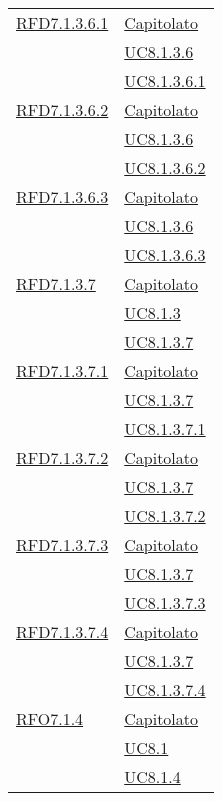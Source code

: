 \begin{longtable}{|>{\centering}m{5cm}|m{5cm}<{\centering}|}
\hyperlink{RFD7.1.3.6.1}{RFD7.1.3.6.1} & \hyperlink{Capitolato}{Capitolato}\\
& \hyperref[UC8.1.3.6]{UC8.1.3.6}\\
& \hyperref[UC8.1.3.6.1]{UC8.1.3.6.1}\\ \hline

\hyperlink{RFD7.1.3.6.2}{RFD7.1.3.6.2} & \hyperlink{Capitolato}{Capitolato}\\
& \hyperref[UC8.1.3.6]{UC8.1.3.6}\\
& \hyperref[UC8.1.3.6.2]{UC8.1.3.6.2}\\ \hline

\hyperlink{RFD7.1.3.6.3}{RFD7.1.3.6.3} & \hyperlink{Capitolato}{Capitolato}\\
& \hyperref[UC8.1.3.6]{UC8.1.3.6}\\
& \hyperref[UC8.1.3.6.3]{UC8.1.3.6.3}\\ \hline

\hyperlink{RFD7.1.3.7}{RFD7.1.3.7} & \hyperlink{Capitolato}{Capitolato}\\
& \hyperref[UC8.1.3]{UC8.1.3}\\
& \hyperref[UC8.1.3.7]{UC8.1.3.7}\\ \hline

\hyperlink{RFD7.1.3.7.1}{RFD7.1.3.7.1} & \hyperlink{Capitolato}{Capitolato}\\
& \hyperref[UC8.1.3.7]{UC8.1.3.7}\\
& \hyperref[UC8.1.3.7.1]{UC8.1.3.7.1}\\ \hline

\hyperlink{RFD7.1.3.7.2}{RFD7.1.3.7.2} & \hyperlink{Capitolato}{Capitolato}\\
& \hyperref[UC8.1.3.7]{UC8.1.3.7}\\
& \hyperref[UC8.1.3.7.2]{UC8.1.3.7.2}\\ \hline

\hyperlink{RFD7.1.3.7.3}{RFD7.1.3.7.3} & \hyperlink{Capitolato}{Capitolato}\\
& \hyperref[UC8.1.3.7]{UC8.1.3.7}\\
& \hyperref[UC8.1.3.7.3]{UC8.1.3.7.3}\\ \hline

\hyperlink{RFD7.1.3.7.4}{RFD7.1.3.7.4} & \hyperlink{Capitolato}{Capitolato}\\
& \hyperref[UC8.1.3.7]{UC8.1.3.7}\\
& \hyperref[UC8.1.3.7.4]{UC8.1.3.7.4}\\ \hline

\hyperlink{RFO7.1.4}{RFO7.1.4} & \hyperlink{Capitolato}{Capitolato}\\
& \hyperref[UC8.1]{UC8.1}\\
& \hyperref[UC8.1.4]{UC8.1.4}\\ \hline


\end{longtable}
